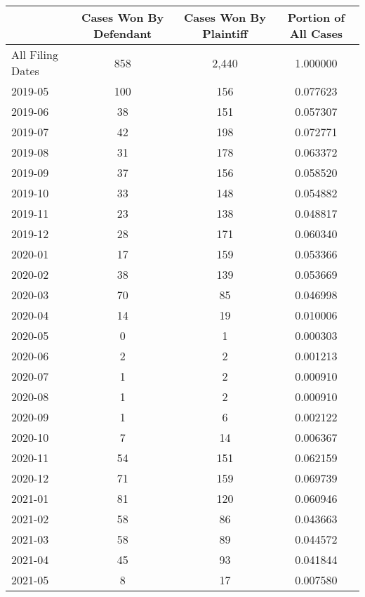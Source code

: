 \begin{tabular}{lccc}
\toprule
 & Cases Won By Defendant & Cases Won By Plaintiff & Portion of All Cases \\
\midrule
All Filing Dates & 858 & 2,440 & 1.000000 \\
2019-05 & 100 & 156 & 0.077623 \\
2019-06 & 38 & 151 & 0.057307 \\
2019-07 & 42 & 198 & 0.072771 \\
2019-08 & 31 & 178 & 0.063372 \\
2019-09 & 37 & 156 & 0.058520 \\
2019-10 & 33 & 148 & 0.054882 \\
2019-11 & 23 & 138 & 0.048817 \\
2019-12 & 28 & 171 & 0.060340 \\
2020-01 & 17 & 159 & 0.053366 \\
2020-02 & 38 & 139 & 0.053669 \\
2020-03 & 70 & 85 & 0.046998 \\
2020-04 & 14 & 19 & 0.010006 \\
2020-05 & 0 & 1 & 0.000303 \\
2020-06 & 2 & 2 & 0.001213 \\
2020-07 & 1 & 2 & 0.000910 \\
2020-08 & 1 & 2 & 0.000910 \\
2020-09 & 1 & 6 & 0.002122 \\
2020-10 & 7 & 14 & 0.006367 \\
2020-11 & 54 & 151 & 0.062159 \\
2020-12 & 71 & 159 & 0.069739 \\
2021-01 & 81 & 120 & 0.060946 \\
2021-02 & 58 & 86 & 0.043663 \\
2021-03 & 58 & 89 & 0.044572 \\
2021-04 & 45 & 93 & 0.041844 \\
2021-05 & 8 & 17 & 0.007580 \\
\bottomrule
\end{tabular}
